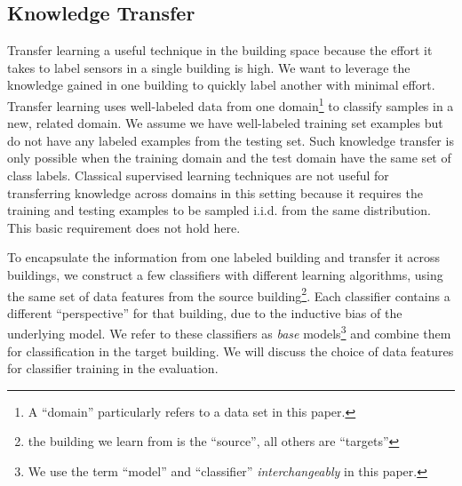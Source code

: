 \subsection{Knowledge Transfer}
Transfer learning a useful technique in the building space because the effort it takes to label sensors in a single building is 
high.  We want to leverage the knowledge gained in one building to quickly label another with minimal effort.  
Transfer learning uses well-labeled data from one domain\footnote{A ``domain'' particularly refers to a data set  in this paper.}  
to classify samples in a new, related domain.
We assume we have well-labeled training set examples but do not have any labeled examples from the testing set. 
Such knowledge transfer is only possible when the training domain and the test domain have the same set of class labels. 
Classical supervised learning techniques are not useful for transferring knowledge across domains in this setting because 
it requires the training and testing examples to be sampled i.i.d. from the same distribution. This basic requirement does not hold here.

To encapsulate the information from one labeled building and transfer it across buildings, we construct a few classifiers with different 
learning algorithms, using the same set of data features from the source building\footnote{the building we learn from is the ``source'', all others are ``targets''}.   
Each classifier contains a different ``perspective'' for that building, due to the inductive bias of the underlying model. 
We refer to these classifiers as {\it base} models\footnote{We use the term ``model'' and ``classifier'' {\it interchangeably} in this paper.} and combine them for 
classification in the target building.
We will discuss the choice of data features for classifier training in the evaluation.


